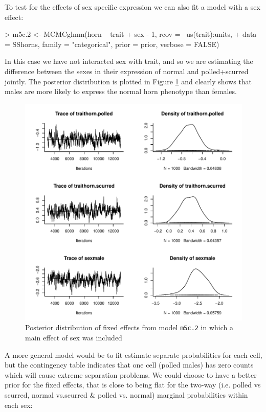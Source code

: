 \documentclass{article}
\begin{document}
To test for the effects of sex specific expression we can also fit a model with a sex effect:

\begin{Schunk}
\begin{Sinput}
> m5c.2 <- MCMCglmm(horn ~ trait + sex - 1, rcov = ~us(trait):units, 
+     data = SShorns, family = "categorical", prior = prior, verbose = FALSE)
\end{Sinput}
\end{Schunk}

In this case we have not interacted sex with trait, and so we are estimating the difference between the sexes in their expression of normal and polled+scurred jointly. The posterior distribution is plotted in Figure \ref{MN2} and clearly shows that males are more likely to express the normal horn phenotype than females.


\begin{figure}[!h]
\begin{center}
\includegraphics{Lecture5-029}
\end{center}
\caption{Posterior distribution of fixed effects from model \texttt{m5c.2} in which a main effect of sex was included}
\label{MN2}
\end{figure}

A more general model would be to fit estimate separate probabilities for each cell, but the contingency table indicates that one cell (polled males) has zero counts which will cause extreme separation problems. We could choose to have a better prior for the fixed effects, that is close to being flat for the two-way (i.e. polled vs scurred, normal vs.scurred \& polled vs. normal) marginal probabilities within each sex:
\end{document}

